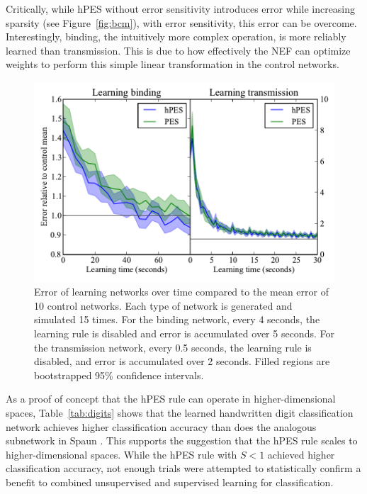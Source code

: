 \documentclass[10pt,letterpaper]{article}
\begin{document}
Critically, while hPES without error sensitivity
introduces error while increasing sparsity
(see Figure~\ref{fig:bcm}), with error sensitivity,
this error can be overcome.
Interestingly, binding,
the intuitively more complex operation,
is more reliably learned than transmission.
This is due to how effectively
the NEF can optimize weights to perform
this simple linear transformation
in the control networks.


\begin{figure}[ht]
\begin{center}
\includegraphics[width=\columnwidth]{fig4-learn-curves}
\end{center}
\caption{Error of learning networks over time compared
  to the mean error of 10 control networks.
  Each type of network is generated and simulated 15 times.
  For the binding network, every 4 seconds,
  the learning rule is disabled and error is accumulated
  over 5 seconds.
  For the transmission network, every 0.5 seconds,
  the learning rule is disabled,
  and error is accumulated over 2 seconds.
  Filled regions are bootstrapped 95\% confidence intervals.}
\label{fig:learn}
\end{figure}

As a proof of concept that the hPES rule
can operate in higher-dimensional spaces,
Table~\ref{tab:digits} shows that 
the learned handwritten digit classification network
achieves higher classification
accuracy than does the analogous
subnetwork in Spaun \cite{Eliasmith2012}.
This supports the suggestion that the hPES rule
scales to higher-dimensional spaces.
While the hPES rule with $S < 1$
achieved higher classification accuracy,
not enough trials were attempted to
statistically confirm a benefit to combined
unsupervised and supervised learning for classification.
\end{document}
